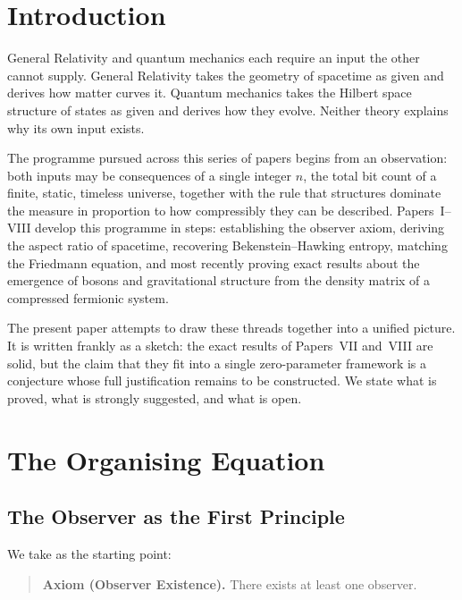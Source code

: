 \documentclass[11pt]{article}
\begin{document}
\section{Introduction}
\label{sec:intro}

General Relativity and quantum mechanics each require an input the other
cannot supply.
General Relativity takes the geometry of spacetime as given and derives
how matter curves it.
Quantum mechanics takes the Hilbert space structure of states as given
and derives how they evolve.
Neither theory explains why its own input exists.

The programme pursued across this series of papers begins from an
observation: both inputs may be consequences of a single integer $n$,
the total bit count of a finite, static, timeless universe, together
with the rule that structures dominate the measure in proportion to how
compressibly they can be described.
Papers~I--VIII \cite{meskanen2001, meskanen2002, meskanen2003,
meskanen2026iv, meskanen2026v, meskanen2026vi, meskanen2026vii,
meskanen2026viii} develop this programme in steps: establishing the
observer axiom, deriving the aspect ratio of spacetime, recovering
Bekenstein--Hawking entropy, matching the Friedmann equation, and
most recently proving exact results about the emergence of bosons and
gravitational structure from the density matrix of a compressed
fermionic system.

The present paper attempts to draw these threads together into a
unified picture.
It is written frankly as a sketch: the exact results of Papers~VII
and~VIII are solid, but the claim that they fit into a single
zero-parameter framework is a conjecture whose full justification
remains to be constructed.
We state what is proved, what is strongly suggested, and what is open.

\section{The Organising Equation}
\label{sec:principle}

\subsection{The Observer as the First Principle}

We take as the starting point:

\begin{quote}
\textbf{Axiom (Observer Existence).} There exists at least one observer.
\end{quote}
\end{document}
